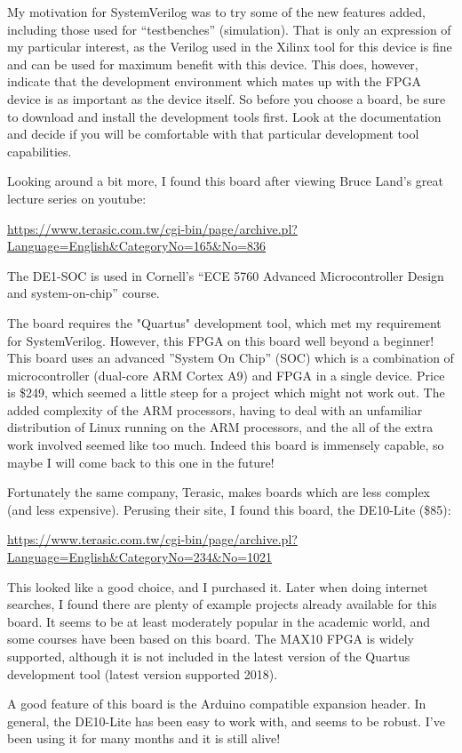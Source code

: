 My motivation for SystemVerilog was to try some of the new features added, including those used for ``testbenches'' (simulation).  That is only an expression of my particular interest, as the Verilog used in the Xilinx tool for this device is fine and can be used for maximum benefit with this device.  This does, however, indicate that the development environment which mates up with the FPGA device is as important as the device itself.  So before you choose a board, be sure to download and install the development tools first.  Look at the documentation and decide if you will be comfortable with that particular development tool capabilities.

Looking around a bit more, I found this board after viewing Bruce Land's great lecture series on youtube:

\url{https://www.terasic.com.tw/cgi-bin/page/archive.pl?Language=English&CategoryNo=165&No=836}

The DE1-SOC is used in Cornell's ``ECE 5760 Advanced Microcontroller Design and system-on-chip'' course.

The board requires the "Quartus" development tool, which met my requirement for SystemVerilog.  However, this FPGA on this board well beyond a beginner!  This board uses an advanced ''System On Chip'' (SOC) which is a combination of microcontroller (dual-core ARM Cortex A9) and FPGA in a single device.  Price is \$249, which seemed a little steep for a project which might not work out.  The added complexity of the ARM processors, having to deal with an unfamiliar distribution of Linux running on the ARM processors, and the all of the extra work involved seemed like too much.  Indeed this board is immensely capable, so maybe I will come back to this one in the future!

Fortunately the same company, Terasic, makes boards which are less complex (and less expensive).  Perusing their site, I found this board, the DE10-Lite (\$85):

\url{https://www.terasic.com.tw/cgi-bin/page/archive.pl?Language=English&CategoryNo=234&No=1021}

This looked like a good choice, and I purchased it.  Later when doing internet searches, I found there are plenty of example projects already available for this board.  It seems to be at least moderately popular in the academic world, and some courses have been based on this board.  The MAX10 FPGA is widely supported, although it is not included in the latest version of the Quartus development tool (latest version supported 2018).

A good feature of this board is the Arduino compatible expansion header.  In general, the DE10-Lite has been easy to work with, and seems to be robust.  I've been using it for many months and it is still alive!



